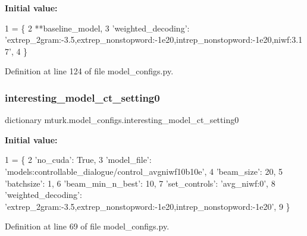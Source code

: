 {\bfseries Initial value\+:}
\begin{DoxyCode}
1 =  \{
2     **baseline\_model,
3     \textcolor{stringliteral}{'weighted\_decoding'}: \textcolor{stringliteral}{'extrep\_2gram:-3.5,extrep\_nonstopword:-1e20,intrep\_nonstopword:-1e20,niwf:3.17'},
4 \}
\end{DoxyCode}


Definition at line 124 of file model\+\_\+configs.\+py.

\mbox{\label{namespacemturk_1_1model__configs_a145826b5c5d2a7e0cb7255e0182a2033}} 
\subsubsection{\texorpdfstring{interesting\+\_\+model\+\_\+ct\+\_\+setting0}{interesting\_model\_ct\_setting0}}
{\footnotesize\ttfamily dictionary mturk.\+model\+\_\+configs.\+interesting\+\_\+model\+\_\+ct\+\_\+setting0}

{\bfseries Initial value\+:}
\begin{DoxyCode}
1 =  \{
2     \textcolor{stringliteral}{'no\_cuda'}: \textcolor{keyword}{True},
3     \textcolor{stringliteral}{'model\_file'}: \textcolor{stringliteral}{'models:controllable\_dialogue/control\_avgniwf10b10e'},
4     \textcolor{stringliteral}{'beam\_size'}: 20,
5     \textcolor{stringliteral}{'batchsize'}: 1,
6     \textcolor{stringliteral}{'beam\_min\_n\_best'}: 10,
7     \textcolor{stringliteral}{'set\_controls'}: \textcolor{stringliteral}{'avg\_niwf:0'},
8     \textcolor{stringliteral}{'weighted\_decoding'}: \textcolor{stringliteral}{'extrep\_2gram:-3.5,extrep\_nonstopword:-1e20,intrep\_nonstopword:-1e20'},
9 \}
\end{DoxyCode}


Definition at line 69 of file model\+\_\+configs.\+py.

\mbox{\label{namespacemturk_1_1model__configs_a173639b5e1dfaf1d8ade8c6ba4b9bfc4}} 
